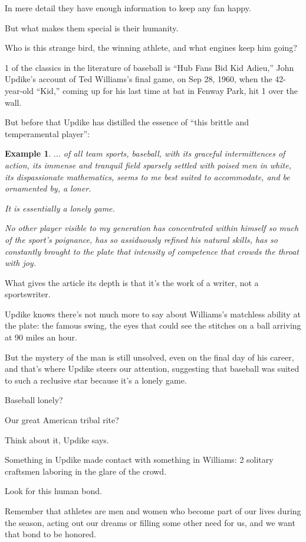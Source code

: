 \documentclass{book}
\numberwithin{equation}{section}
\newtheorem{example}{Example}[chapter]
\begin{document}
In mere detail they have enough information to keep any fan happy.

But what makes them special is their humanity.

Who is this strange bird, the winning athlete, and what engines keep him going?

1 of the classics in the literature of baseball is ``Hub Fans Bid Kid Adieu,'' John Updike's account of Ted Williams's final game, on Sep 28, 1960, when the 42-year-old ``Kid,'' coming up for his last time at bat in Fenway Park, hit 1 over the wall.

But before that Updike has distilled the essence of ``this brittle and temperamental player'':
\begin{example}
    $\ldots$ of all team sports, baseball, with its graceful intermittences of action, its immense and tranquil field sparsely settled with poised men in white, its dispassionate mathematics, seems to me best suited to accommodate, and be ornamented by, a loner.
    
    It is essentially a lonely game.
    
    No other player visible to my generation has concentrated within himself so much of the sport's poignance, has so assiduously refined his natural skills, has so constantly brought to the plate that intensity of competence that crowds the throat with joy.
\end{example}
What gives the article its depth is that it's the work of a writer, not a sportswriter.

Updike knows there's not much more to say about Williams's matchless ability at the plate: the famous swing, the eyes that could see the stitches on a ball arriving at 90 miles an hour.

But the mystery of the man is still unsolved, even on the final day of his career, and that's where Updike steers our attention, suggesting that baseball was suited to such a reclusive star because it's a lonely game.

Baseball lonely?

Our great American tribal rite?

Think about it, Updike says.

%
Something in Updike made contact with something in Williams: 2 solitary craftsmen laboring in the glare of the crowd.

Look for this human bond.

Remember that athletes are men and women who become part of our lives during the season, acting out our dreams or filling some other need for us, and we want that bond to be honored.
\end{document}
